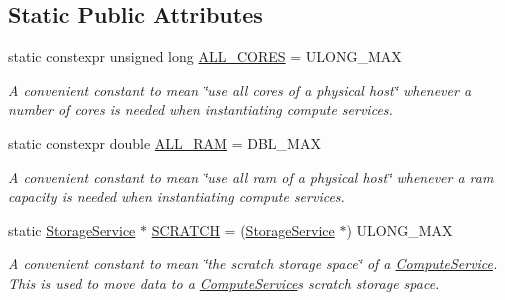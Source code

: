 \subsection*{Static Public Attributes}
\begin{DoxyCompactItemize}
\item 
\mbox{\label{classwrench_1_1_compute_service_a1160f521623440ad4e0e0823e08a7d22}} 
static constexpr unsigned long \hyperlink{classwrench_1_1_compute_service_a1160f521623440ad4e0e0823e08a7d22}{A\+L\+L\+\_\+\+C\+O\+R\+ES} = U\+L\+O\+N\+G\+\_\+\+M\+AX
\begin{DoxyCompactList}\small\item\em A convenient constant to mean \char`\"{}use all cores of a physical host\char`\"{} whenever a number of cores is needed when instantiating compute services. \end{DoxyCompactList}\item 
\mbox{\label{classwrench_1_1_compute_service_abc4fe0bad59f544b4b34d0e7d4012d44}} 
static constexpr double \hyperlink{classwrench_1_1_compute_service_abc4fe0bad59f544b4b34d0e7d4012d44}{A\+L\+L\+\_\+\+R\+AM} = D\+B\+L\+\_\+\+M\+AX
\begin{DoxyCompactList}\small\item\em A convenient constant to mean \char`\"{}use all ram of a physical host\char`\"{} whenever a ram capacity is needed when instantiating compute services. \end{DoxyCompactList}\item 
\mbox{\label{classwrench_1_1_compute_service_a022e9408f53191b4102e2ce00487799c}} 
static \hyperlink{classwrench_1_1_storage_service}{Storage\+Service} $\ast$ \hyperlink{classwrench_1_1_compute_service_a022e9408f53191b4102e2ce00487799c}{S\+C\+R\+A\+T\+CH} = (\hyperlink{classwrench_1_1_storage_service}{Storage\+Service} $\ast$) U\+L\+O\+N\+G\+\_\+\+M\+AX
\begin{DoxyCompactList}\small\item\em A convenient constant to mean \char`\"{}the scratch storage space\char`\"{} of a \hyperlink{classwrench_1_1_compute_service}{Compute\+Service}. This is used to move data to a \hyperlink{classwrench_1_1_compute_service}{Compute\+Service}\textquotesingle{}s scratch storage space. \end{DoxyCompactList}\end{DoxyCompactItemize}
